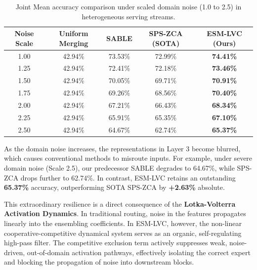 \begin{table}[t]
\caption{Joint Mean accuracy comparison under scaled domain noise (1.0 to 2.5) in heterogeneous serving streams.}
\label{tab:noise_results}
\vskip 0.15in
\begin{center}
\begin{small}
\begin{sc}
\begin{tabular}{ccccc}
\toprule
Noise Scale & Uniform Merging & SABLE & SPS-ZCA (SOTA) & \textbf{ESM-LVC (Ours)} \\
\midrule
1.00 & 42.94\% & 73.53\% & 72.99\% & \textbf{74.41\%} \\
1.25 & 42.94\% & 72.41\% & 72.18\% & \textbf{73.46\%} \\
1.50 & 42.94\% & 70.05\% & 69.71\% & \textbf{70.91\%} \\
1.75 & 42.94\% & 69.26\% & 68.56\% & \textbf{70.40\%} \\
2.00 & 42.94\% & 67.21\% & 66.43\% & \textbf{68.34\%} \\
2.25 & 42.94\% & 65.91\% & 65.35\% & \textbf{67.10\%} \\
2.50 & 42.94\% & 64.67\% & 62.74\% & \textbf{65.37\%} \\
\bottomrule
\end{tabular}
\end{sc}
\end{small}
\end{center}
\vskip -0.1in
\end{table}

As the domain noise increases, the representations in Layer 3 become blurred, which causes conventional methods to misroute inputs. For example, under severe domain noise (Scale 2.5), our predecessor SABLE degrades to 64.67\%, while SPS-ZCA drops further to 62.74\%. 
In contrast, ESM-LVC retains an outstanding \textbf{65.37\%} accuracy, outperforming SOTA SPS-ZCA by \textbf{+2.63\%} absolute.

This extraordinary resilience is a direct consequence of the \textbf{Lotka-Volterra Activation Dynamics}. In traditional routing, noise in the features propagates linearly into the ensembling coefficients. In ESM-LVC, however, the non-linear cooperative-competitive dynamical system serves as an organic, self-regulating high-pass filter. The competitive exclusion term actively suppresses weak, noise-driven, out-of-domain activation pathways, effectively isolating the correct expert and blocking the propagation of noise into downstream blocks.


